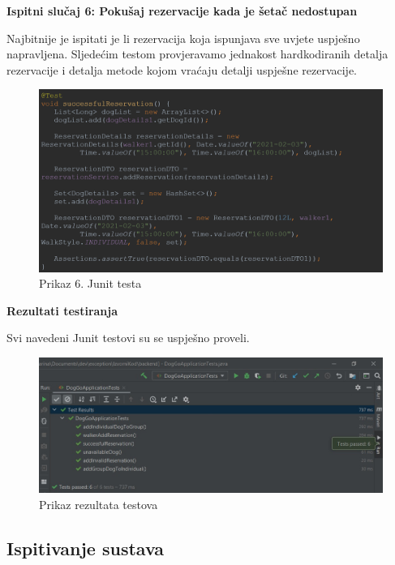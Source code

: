 			\noindent \textbf{Ispitni slučaj 6: Pokušaj rezervacije kada je šetač nedostupan}
			
    		Najbitnije je ispitati je li rezervacija koja ispunjava sve uvjete uspješno napravljena. Sljedećim testom provjeravamo jednakost hardkodiranih detalja rezervacije i detalja metode kojom vraćaju detalji uspješne rezervacije.
			
			\begin{figure}[H]
				\includegraphics[scale=0.6]{slike/junit-6.PNG}
				\centering
				\caption{Prikaz 6. Junit testa}
				\label{fig:testiranje}
			\end{figure}
			
			\noindent \textbf{Rezultati testiranja}
			
			Svi navedeni Junit testovi su se uspješno proveli.
			
			\begin{figure}[H]
				\includegraphics[scale=0.4]{slike/tests-passed.JPEG}
				\centering
				\caption{Prikaz rezultata testova}
				\label{fig:testiranje}
			\end{figure}
			
			\subsection{Ispitivanje sustava}
			
